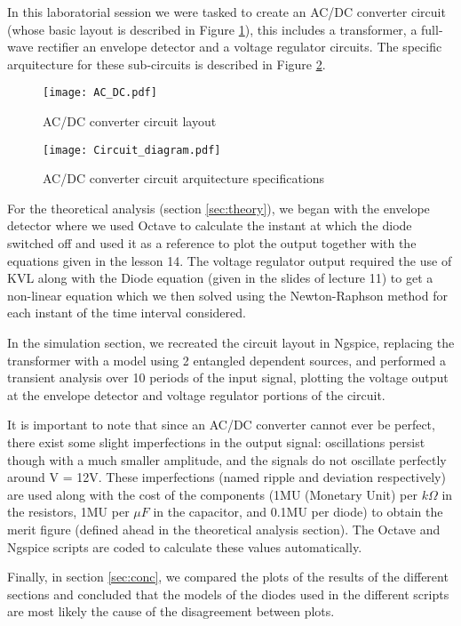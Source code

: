 \hspace{12pt} In this laboratorial session we were tasked to create an AC/DC converter circuit (whose basic layout is described in Figure \ref{fig:ac_dc}), this includes a transformer, a full-wave rectifier an envelope detector and a voltage regulator circuits. The specific arquitecture for these sub-circuits is described in Figure \ref{fig:circuit}.

\begin{figure}[h]
	\centering
	\texttt{[image: AC\_DC.pdf]}
	\caption{AC/DC converter circuit layout}
	\label{fig:ac_dc}
\end{figure}
 
 \begin{figure}[h]
 	\centering
	\texttt{[image: Circuit\_diagram.pdf]}
	\caption{AC/DC converter circuit arquitecture specifications}
	\label{fig:circuit}
 \end{figure}
 
For the theoretical analysis (section \ref{sec:theory}), we began with the envelope detector where we used Octave to calculate the instant at which the diode switched off and used it as a reference to plot the output together with the equations given in the lesson 14. The voltage regulator output required the use of KVL along with the Diode equation (given in the slides of lecture 11) to get a non-linear equation which we then solved using the Newton-Raphson method for each instant of the time interval considered.

In the simulation section, we recreated the circuit layout in Ngspice, replacing the transformer with a model using 2 entangled dependent sources, and performed a transient analysis over 10 periods of the input signal, plotting the voltage output at the envelope detector and voltage regulator portions of the circuit.

It is important to note that since an AC/DC converter cannot ever be perfect, there exist some slight imperfections in the output signal: oscillations persist though with a much smaller amplitude, and the signals do not oscillate perfectly around V = 12V. These imperfections (named ripple and deviation respectively) are used along with the cost of the components (1MU (Monetary Unit) per $k \Omega$ in the resistors, 1MU per $\mu F$ in the capacitor, and 0.1MU per diode) to obtain the merit figure (defined ahead in the theoretical analysis section). The Octave and Ngspice scripts are coded to calculate these values automatically.

Finally, in section \ref{sec:conc}, we compared the plots of the results of the different sections and concluded that the models of the diodes used in the different scripts are most likely the cause of the disagreement between plots.

\pagebreak
